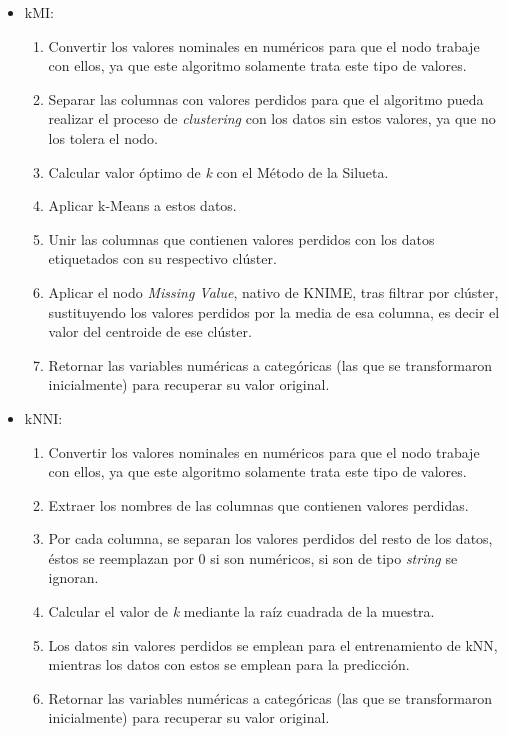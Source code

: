 \begin{itemize}
	\item kMI:
	\begin{enumerate}
		\item Convertir los valores nominales en numéricos para que el nodo trabaje con ellos, ya que este algoritmo solamente trata este tipo de valores.
		\item Separar las columnas con valores perdidos para que el algoritmo pueda realizar el proceso de \textit{clustering} con los datos sin estos valores, ya que no los tolera el nodo.
		\item Calcular valor óptimo de \textit{k} con el Método de la Silueta.
		\item Aplicar k-Means a estos datos.
		\item Unir las columnas que contienen valores perdidos con los datos etiquetados con su respectivo clúster.
		\item Aplicar el nodo \textit{Missing Value}, nativo de KNIME, tras filtrar por clúster, sustituyendo los valores perdidos por la media de esa columna, es decir el valor del centroide de ese clúster.
		\item Retornar las variables numéricas a categóricas (las que se transformaron inicialmente) para recuperar su valor original.
	\end{enumerate}
	\item kNNI:
	\begin{enumerate}
		\item Convertir los valores nominales en numéricos para que el nodo trabaje con ellos, ya que este algoritmo solamente trata este tipo de valores.
		\item Extraer los nombres de las columnas que contienen valores perdidas.
		\item Por cada columna, se separan los valores perdidos del resto de los datos, éstos se reemplazan por 0 si son numéricos, si son de tipo \textit{string} se ignoran.
		\item Calcular el valor de \textit{k} mediante la raíz cuadrada de la muestra. 
		\item Los datos sin valores perdidos se emplean para el entrenamiento de kNN, mientras los datos con estos se emplean para la predicción.
		\item Retornar las variables numéricas a categóricas (las que se transformaron inicialmente) para recuperar su valor original.
	\end{enumerate}
\end{itemize}


